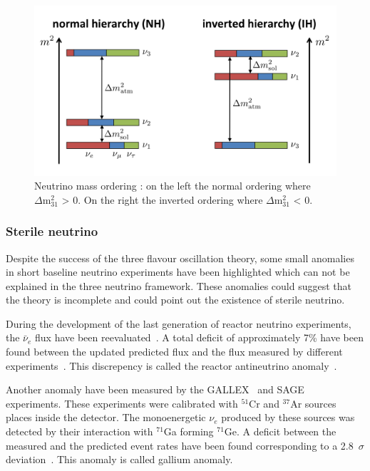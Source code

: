 \documentclass[main.tex]{subfiles}
\begin{document}
\begin{figure}
\begin{center}
\includegraphics[scale=0.13]{pictures/Chap1/mass-hierarchy.png}
\caption{Neutrino mass ordering : on the left the normal ordering where $\Delta\text{m}^\text{2}_\text{31}$ > 0. On the right the inverted ordering where $\Delta\text{m}^\text{2}_\text{31}$ < 0.}
\label{MassOrdering}
\end{center}
\end{figure}


\FloatBarrier


\subsubsection{Sterile neutrino}


\NI Despite the success of the three flavour oscillation theory, some small anomalies in short baseline neutrino experiments have been highlighted which can not be explained in the three neutrino framework. These anomalies could suggest that the theory is incomplete and could point out the existence of sterile neutrino.


\bigskip


\NI During the development of the last generation of reactor neutrino experiments, the $\bar{\nu}_e$ flux have been reevaluated~\cite{PredictionReactorAntiNeutrino1,PredictionReactorAntiNeutrino2}. A total deficit of approximately 7\% have been found between the updated predicted flux and the flux measured by different experiments~\cite{DeficitReactor7}. This discrepency is called the reactor antineutrino anomaly~\cite{ReactorAnomaly}. 


\bigskip


\NI Another anomaly have been measured by the GALLEX~\cite{Gallex} and SAGE~\cite{SAGE} experiments. These experiments were calibrated with $^{\text{51}}$Cr and $^{\text{37}}$Ar sources places inside the detector. The monoenergetic $\nu_e$ produced by these sources was detected by their interaction with $^{\text{71}}$Ga forming $^{\text{71}}$Ge. A deficit between the measured and the predicted event rates have been found corresponding to a 2.8~$\sigma$ deviation~\cite{LightSterileNeutrino}. This anomaly is called gallium anomaly.
\end{document}
